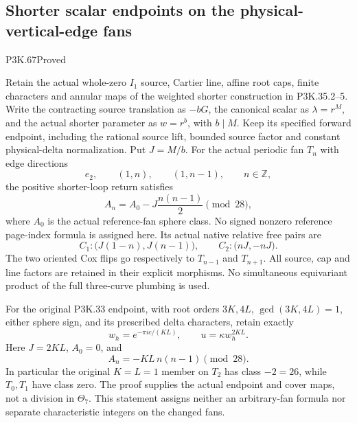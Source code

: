 \subsection{Shorter scalar endpoints on the physical-vertical-edge fans}
\begin{statement}{P3K.67}{Proved}

Retain the actual whole-zero \(I_1\) source, Cartier line, affine
root caps, finite characters and annular maps of the weighted shorter
construction in P3K.35.2--5. Write the contracting source translation
as \(-bG\), the canonical scalar as \(\lambda=r^M\), and the actual
shorter parameter as \(w=r^b\), with \(b\mid M\). Keep its specified
forward endpoint, including the rational source lift, bounded source
factor and constant physical-delta normalization. Put \(J=M/b\).
For the actual periodic fan \(T_n\) with edge directions
\[
                 e_2,\qquad (1,n),\qquad(1,n-1),
                         \qquad n\in\mathbb Z,
\]
the positive shorter-loop return satisfies
\[
 A_n=A_0-J\frac{n(n-1)}2\pmod{28},
 \tag{P3K.67.0}
\]
where \(A_0\) is the actual reference-fan sphere class. No signed
nonzero reference page-index formula is assigned here.
Its actual native relative free pairs are
\[
 C_1:\bigl(J(1-n),J(n-1)\bigr),\qquad
 C_2:\bigl(nJ,-nJ\bigr).
\]
The two oriented Cox flips go respectively to \(T_{n-1}\) and
\(T_{n+1}\). All source, cap and line factors are retained in their
explicit morphisms. No simultaneous equivariant product of the full
three-curve plumbing is used.

For the original P3K.33 endpoint, with root orders \(3K,4L\),
\(\gcd(3K,4L)=1\), either sphere sign, and its prescribed delta
characters, retain exactly
\[
 w_h=e^{-\pi ic/(KL)},\qquad u=\kappa w_h^{2KL}.
\]
Here \(J=2KL\), \(A_0=0\), and
\[
                       A_n=-KL\,n(n-1)\pmod{28}.
\]
In particular the original \(K=L=1\) member on \(T_2\) has class
\(-2=26\), while \(T_0,T_1\) have class zero. The proof supplies
the actual endpoint and cover maps, not a division in \(\Theta_7\).
This statement assigns neither an arbitrary-fan formula nor separate
characteristic integers on the changed fans.
\end{statement}
